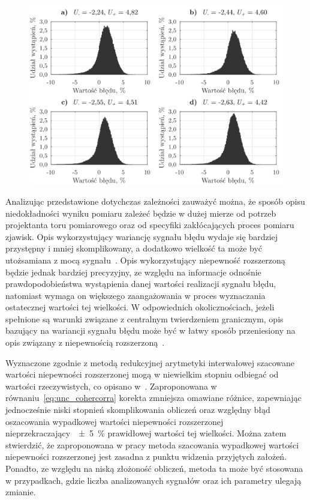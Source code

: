 \begin{figure}[htb!]
\begin{center}
\includegraphics{obrazki/hist_reductive}
\end{center}
\end{figure}

Analizując przedstawione dotychczas zależności zauważyć można, że sposób opisu niedokładności wyniku pomiaru zależeć będzie w dużej mierze od potrzeb projektanta toru pomiarowego oraz od specyfiki zakłócających proces pomiaru zjawisk. Opis wykorzystujący wariancję sygnału błędu wydaje się bardziej przystępny i mniej skomplikowany, a dodatkowo wielkość ta może być utożsamiana z mocą sygnału~\cite{proakis_dsp}. Opis wykorzystujący niepewność rozszerzoną będzie jednak bardziej precyzyjny, ze względu na informacje odnośnie prawdopodobieństwa wystąpienia danej wartości realizacji sygnału błędu, natomiast wymaga on większego zaangażowania w proces wyznaczania ostatecznej wartości tej wielkości. W odpowiednich okolicznościach, jeżeli spełnione są warunki związane z centralnym twierdzeniem granicznym, opis bazujący na wariancji sygnału błędu może być w łatwy sposób przeniesiony na opis związany z niepewnością rozszerzoną~\cite{jcgm_guide}.

Wyznaczone zgodnie z metodą redukcyjnej arytmetyki interwałowej szacowane wartości niepewności rozszerzonej mogą w niewielkim stopniu odbiegać od wartości rzeczywistych, co opisano w~\cite{jakubiec_redmono, jakubiec_model}. Zaproponowana w równaniu~\eqref{eq:unc_cohercorra} korekta zmniejsza omawiane różnice, zapewniając jednocześnie niski stopnień skomplikowania obliczeń oraz względny błąd oszacowania wypadkowej wartości niepewności rozszerzonej nieprzekraczający~\qty{\pm 5}{\percent} prawidłowej wartości tej wielkości. Można zatem stwierdzić, że zaproponowana w pracy metoda szacowania wypadkowej wartości niepewności rozszerzonej jest zasadna z punktu widzenia przyjętych założeń. Ponadto, ze względu na niską złożoność obliczeń, metoda ta może być stosowana w przypadkach, gdzie liczba analizowanych sygnałów oraz ich parametry ulegają zmianie.

